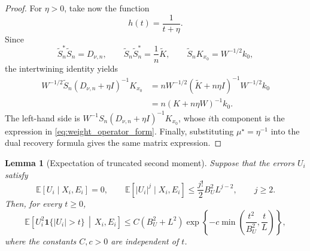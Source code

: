 \documentclass[11pt]{article}
\newtheorem{lemma}{Lemma}[section]
\newcommand{\E}{\mathbb{E}}
\begin{document}
\begin{proof}
For $\eta > 0$, take now the function
\[
  h(t)=\frac{1}{t+\eta}.
\]
Since
\[
 \widetilde S_n^*\widetilde S_n=D_{\nu,n},\qquad
 \widetilde S_n\widetilde S_n^*=\frac1n\widetilde K,\qquad
 \widetilde S_nK_{x_0}=W^{-1/2}k_0,
\]
the intertwining identity yields
\begin{align*}
 W^{-1/2}\widetilde S_n(D_{\nu,n}+\eta I)^{-1}K_{x_0}
 &=nW^{-1/2}(\widetilde K+n\eta I)^{-1}W^{-1/2}k_0\\
 &=n(K+n\eta W)^{-1}k_0.
\end{align*}
The left-hand side is $W^{-1}S_n(D_{\nu,n}+\eta I)^{-1}K_{x_0}$, whose $i$th component is the expression in \eqref{eq:weight_operator_form}. Finally, substituting $\mu^\star=\eta^{-1}$ into the dual recovery formula gives the same matrix expression.
\end{proof}



\begin{lemma}[Expectation of truncated second moment]
\label{lem:truncated_second_moment}
Suppose that the errors $U_i$ satisfy
\[
\E[U_i\mid X_i,E_i]=0,
\qquad
\E[|U_i|^j\mid X_i,E_i]
\leq
\frac{j!}{2}B_U^2 L^{j-2},
\qquad j\geq 2.
\]
Then, for every $t\geq 0$,
\begin{equation}
\label{eq:truncated_2nd_moment_tail_bound}
\E\!\left[
    U_i^2\bm{1}\{|U_i|>t\}
    \,\middle|\,X_i,E_i
\right]
\leq
C(B_U^2+L^2)
\exp\!\left\{
    -c\min\left(
        \frac{t^2}{B_U^2},
        \frac{t}{L}
    \right)
\right\},
\end{equation}
where the constants $C,c>0$ are independent of $t$.
\end{lemma}
\end{document}
